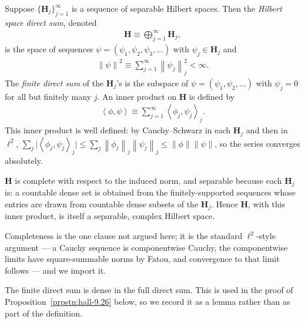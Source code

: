 \begin{definition}
    \label{def:hall-a.45}
    \leanok
    Suppose $\{ \mathbf{H}_j \}_{j=1}^\infty$ is a sequence of separable Hilbert spaces. Then the \textit{Hilbert space direct sum}, denoted
    \begin{align}
        \mathbf{H} \equiv \bigoplus_{j=1}^\infty \mathbf{H}_j,
    \end{align}
    is the space of sequences $\psi = (\psi_1, \psi_2, \psi_3, \ldots)$ with $\psi_j \in \mathbf{H}_j$ and
    \begin{align}
        \left\| \psi \right\|^2 \equiv \sum_{j=1}^\infty \left\| \psi_j \right\|_j^2 < \infty.
    \end{align}
    The \textit{finite direct sum} of the $\mathbf{H}_j$'s is the subspace of $\psi = (\psi_1, \psi_2, \ldots)$ with $\psi_j = 0$ for all but finitely many $j$. An inner product on $\mathbf{H}$ is defined by
    \begin{align}
        \left< \phi, \psi \right> \equiv \sum_{j=1}^\infty \left< \phi_j, \psi_j \right>_j.
    \end{align}
    This inner product is well defined: by Cauchy–Schwarz in each $\mathbf{H}_j$ and then in $\ell^2$, $\sum_j \lvert \left< \phi_j, \psi_j \right>_j \rvert \le \sum_j \left\| \phi_j \right\|_j \left\| \psi_j \right\|_j \le \left\| \phi \right\| \left\| \psi \right\|$, so the series converges absolutely.

    $\mathbf{H}$ is complete with respect to the induced norm, and separable because each $\mathbf{H}_j$ is: a countable dense set is obtained from the finitely-supported sequences whose entries are drawn from countable dense subsets of the $\mathbf{H}_j$. Hence $\mathbf{H}$, with this inner product, is itself a separable, complex Hilbert space.

    Completeness is the one clause not argued here; it is the standard $\ell^2$-style argument — a Cauchy sequence is componentwise Cauchy, the componentwise limits have square-summable norms by Fatou, and convergence to that limit follows — and we import it.
\end{definition}

The finite direct sum is dense in the full direct sum. This is used in the proof of Proposition~\ref{prpstn:hall-9.26} below, so we record it as a lemma rather than as part of the definition.

